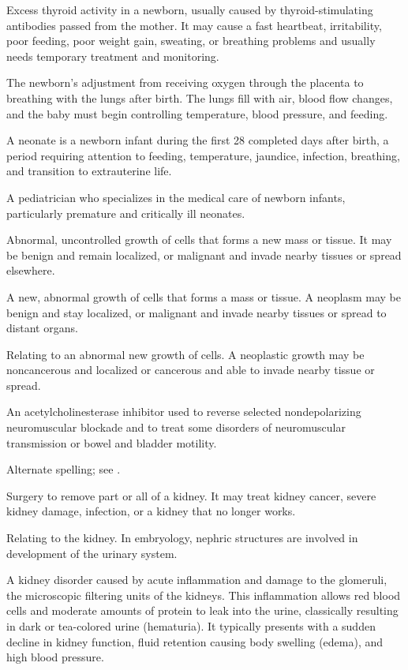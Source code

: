  Excess thyroid activity in a newborn, usually caused by thyroid-stimulating antibodies passed from the mother. It may cause a fast heartbeat, irritability, poor feeding, poor weight gain, sweating, or breathing problems and usually needs temporary treatment and monitoring.

 The newborn’s adjustment from receiving oxygen through the placenta to breathing with the lungs after birth. The lungs fill with air, blood flow changes, and the baby must begin controlling temperature, blood pressure, and feeding.

 A neonate is a newborn infant during the first 28 completed days after birth, a period requiring attention to feeding, temperature, jaundice, infection, breathing, and transition to extrauterine life.

 A pediatrician who specializes in the medical care of newborn infants, particularly
premature and critically ill neonates.

 Abnormal, uncontrolled growth of cells that forms a new mass or tissue. It may be benign and remain localized, or malignant and invade nearby tissues or spread elsewhere.

 A new, abnormal growth of cells that forms a mass or tissue. A neoplasm may be benign and stay localized, or malignant and invade nearby tissues or spread to distant organs.

 Relating to an abnormal new growth of cells. A neoplastic growth may be noncancerous and localized or cancerous and able to invade nearby tissue or spread.

 An acetylcholinesterase inhibitor used to reverse selected nondepolarizing neuromuscular blockade and to treat some disorders of neuromuscular transmission or bowel and bladder motility.

 Alternate spelling; see .

 Surgery to remove part or all of a kidney. It may treat kidney cancer, severe kidney damage, infection, or a kidney that no longer works.

 Relating to the kidney. In embryology, nephric structures are involved in development of the urinary system.

 A kidney disorder caused by acute inflammation and damage to the glomeruli, the microscopic filtering units of the kidneys. This inflammation allows red blood cells and moderate amounts of protein to leak into the urine, classically resulting in dark or tea-colored urine (hematuria). It typically presents with a sudden decline in kidney function, fluid retention causing body swelling (edema), and high blood pressure.

